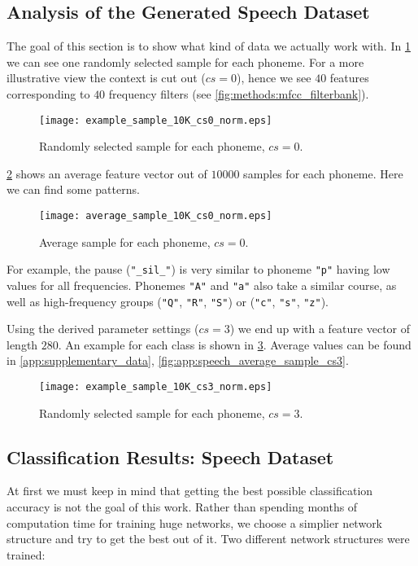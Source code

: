 \subsection*{Analysis of the Generated Speech Dataset}
The goal of this section is to show what kind of data we actually work with. In \cref{fig:examples:speech_example_sample_cs0} we can see one randomly selected sample for each phoneme. For a more illustrative view the context is cut out ($ cs = 0 $), hence we see $ 40 $ features corresponding to $ 40 $ frequency filters (see \cref{fig:methods:mfcc_filterbank}).

\begin{figure}[H]
\centering
\texttt{[image: example\_sample\_10K\_cs0\_norm.eps]}
\caption{Randomly selected sample for each phoneme, $ cs = 0 $.}
\label{fig:examples:speech_example_sample_cs0}
\end{figure}

\cref{fig:examples:speech_average_sample_cs0} shows an average feature vector out of $ 10000 $ samples for each phoneme. Here we can find some patterns.

\begin{figure}[H]
\centering
\texttt{[image: average\_sample\_10K\_cs0\_norm.eps]}
\caption{Average sample for each phoneme, $ cs = 0 $.}
\label{fig:examples:speech_average_sample_cs0}
\end{figure}

For example, the pause (\texttt{"\_sil\_"}) is very similar to phoneme \texttt{"p"} having low values for all frequencies. Phonemes \texttt{"A"} and \texttt{"a"} also take a similar course, as well as high-frequency groups (\texttt{"Q"}, \texttt{"R"}, \texttt{"S"}) or (\texttt{"c"}, \texttt{"s"}, \texttt{"z"}).

Using the derived parameter settings ($ cs = 3 $) we end up with a feature vector of length $ 280 $. An example for each class is shown in \cref{fig:examples:speech_example_sample_cs3}. Average values can be found in \cref{app:supplementary_data}, \cref{fig:app:speech_average_sample_cs3}.

\begin{figure}[H]
\centering
\texttt{[image: example\_sample\_10K\_cs3\_norm.eps]}
\caption{Randomly selected sample for each phoneme, $ cs = 3 $.}
\label{fig:examples:speech_example_sample_cs3}
\end{figure}

\subsection*{Classification Results: Speech Dataset}
At first we must keep in mind that getting the best possible classification accuracy is not the goal of this work. Rather than spending months of computation time for training huge networks, we choose a simplier network structure and try to get the best out of it. Two different network structures were trained:

